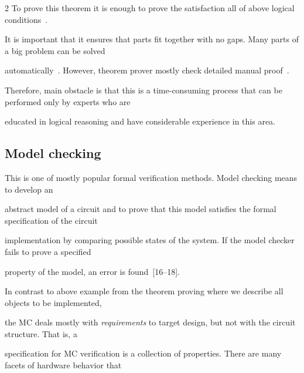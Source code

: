 \begin{multicols}{2}
   To prove this theorem it is enough to prove the satisfaction all of above logical conditions~\cite{13bar}.





   It is important that it ensures that parts fit together with no gaps. Many parts of a big problem can be solved


automatically~\cite{9bar}. However, theorem prover mostly check detailed manual proof~\cite{4bar}.


Therefore, main obstacle is that this is a time-consuming process that can be performed only by experts who are


educated in logical reasoning and have considerable experience in this area.


{%





}










\subsection{Model checking} %





   \noindent


This is one of mostly popular formal verification methods. Model checking means to develop an


abstract model of a circuit and to prove that this model satisfies the formal specification of the circuit


implementation by comparing possible states of the system. If the model checker fails to prove a specified


property of the model, an error is found~[16--18].





   In contrast to above example from the theorem proving where we describe all objects to be implemented,


the MC deals mostly with \textit{requirements} to target design, but not with the circuit structure. That is, a


specification for MC verification is a collection of properties. There are many facets of hardware behavior that



\end{multicols}

